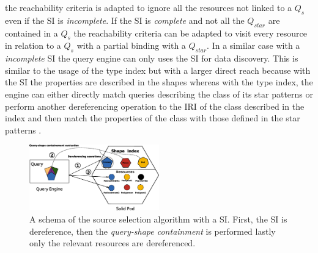 the reachability criteria is adapted to ignore all the resources not linked to a $Q_{s}$ even if the SI is \emph{incomplete}.
If the SI is \emph{complete} and not all the $Q_{star}$ are contained in a $Q_{s}$ the reachability criteria can be adapted
to visit every resource in relation to a $Q_{s}$ with a partial binding with a $Q_{star}$.
In a similar case with a \emph{incomplete} SI the query engine can only uses the SI for data discovery.
This is similar to the usage of the type index but with a larger direct reach because with the SI the properties are described in the shapes
whereas with the type index, the engine can either directly match queries describing the class of its star patterns or perform
another dereferencing operation to the IRI of the class described in the index and then match the properties of the class with those defined in the star patterns \cite{Taelman2023}.

\begin{figure}
    \centering
    \includegraphics[width=0.5\textwidth]{figure/shape_containement}
    \caption{A schema of the source selection algorithm with a SI. First, the SI is dereference, 
    then the \emph{query-shape containment} is performed lastly only the relevant resources are dereferenced.}
    \label{fig:shape_index}
\end{figure}